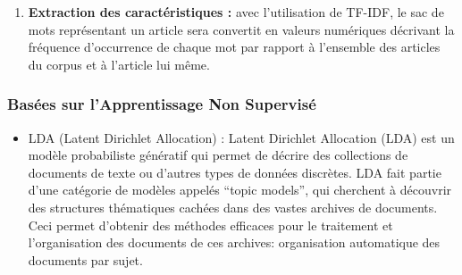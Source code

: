 \begin{enumerate}
                
                
                
                
                
                \item{\textbf{Extraction des caractéristiques :} }avec l'utilisation de TF-IDF, le sac de mots représentant un article sera convertit en valeurs numériques décrivant la fréquence d'occurrence de chaque mot par rapport à l'ensemble des articles du corpus et à l'article lui même.\\
            
        
            \end{enumerate}

        \subsubsection{Basées sur l'Apprentissage Non Supervisé}
        
        \begin{itemize}
            \item{LDA (Latent Dirichlet Allocation) : }
            Latent Dirichlet Allocation (LDA) est un modèle probabiliste génératif qui permet de décrire des collections de documents de texte ou d’autres types de données discrètes. LDA fait partie d’une catégorie de modèles appelés “topic models”, qui cherchent à découvrir des structures thématiques cachées dans des vastes archives de documents. Ceci permet d’obtenir des méthodes efficaces pour le traitement et l’organisation des documents de ces archives: organisation automatique des documents par sujet.
            
        \end{itemize}
        
